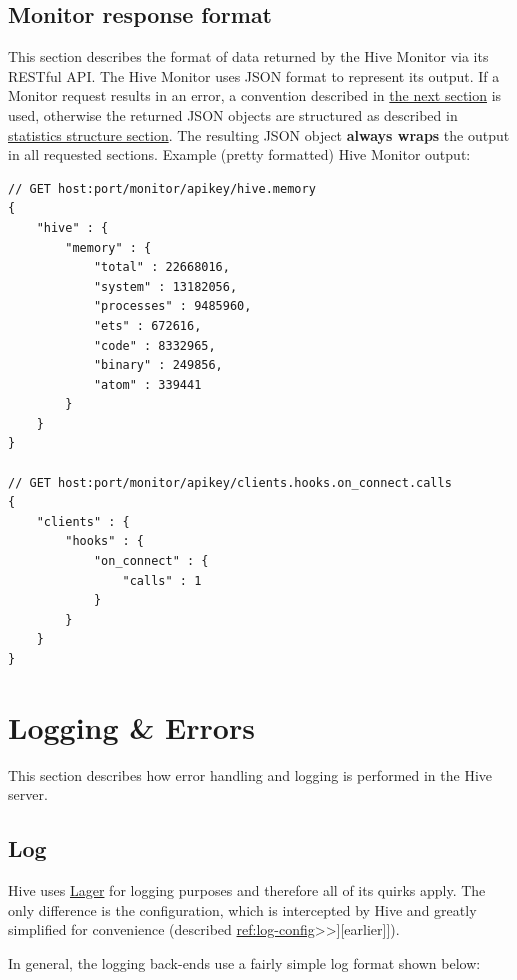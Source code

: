 \documentclass[a4paper]{article}
\begin{document}
\subsection{Monitor response format}
\label{sec-4-4}

This section describes the format of data returned by the Hive Monitor via its RESTful API. The Hive Monitor uses JSON format to represent its output. If a Monitor request results in an error, a convention described in \hyperref[sec-5-4]{the next section} is used, otherwise the returned JSON objects are structured as described in \hyperref[sec-4-1]{statistics structure section}. The resulting JSON object \textbf{always wraps} the output in all requested sections. Example (pretty formatted) Hive Monitor output:


\begin{verbatim}
// GET host:port/monitor/apikey/hive.memory
{
    "hive" : {
        "memory" : {
            "total" : 22668016,
            "system" : 13182056,
            "processes" : 9485960,
            "ets" : 672616,
            "code" : 8332965,
            "binary" : 249856,
            "atom" : 339441
        }
    }
}

// GET host:port/monitor/apikey/clients.hooks.on_connect.calls
{
    "clients" : {
        "hooks" : {
            "on_connect" : {
                "calls" : 1
            }
        }
    }
}
\end{verbatim}




\pagebreak
\section{Logging \& Errors}
\label{sec-5}

This section describes how error handling and logging is performed in the Hive server.
\subsection{Log}
\label{sec-5-1}

Hive uses \href{https://github.com/basho/lager}{Lager} for logging purposes and therefore all of its quirks apply. The only difference is the configuration, which is intercepted by Hive and greatly simplified for convenience (described \hyperref[sec-3-1-8]{ref:log-config}>>][earlier]]).

\noindent
In general, the logging back-ends use a fairly simple log format shown below:
\end{document}
